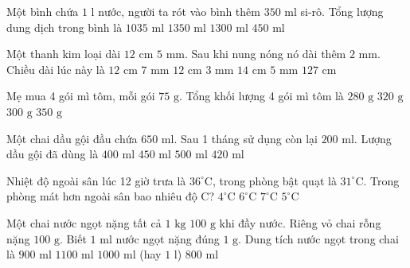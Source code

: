 \begin{ex} %
Một bình chứa $1\text{ l}$ nước, người ta rót vào bình thêm $350\text{ ml}$ si-rô. Tổng lượng dung dịch trong bình là
\choice
{$1035\text{ ml}$}
{\True $1350\text{ ml}$}
{$1300\text{ ml}$}
{$450\text{ ml}$}
\end{ex}

\begin{ex} %
Một thanh kim loại dài $12\text{ cm } 5\text{ mm}$. Sau khi nung nóng nó dài thêm $2\text{ mm}$. Chiều dài lúc này là
\choice
{\True $12\text{ cm } 7\text{ mm}$}
{$12\text{ cm } 3\text{ mm}$}
{$14\text{ cm } 5\text{ mm}$}
{$127\text{ cm}$}
\end{ex}

\begin{ex} %
Mẹ mua 4 gói mì tôm, mỗi gói $75\text{ g}$. Tổng khối lượng 4 gói mì tôm là
\choice
{$280\text{ g}$}
{$320\text{ g}$}
{\True $300\text{ g}$}
{$350\text{ g}$}
\end{ex}

\begin{ex} %
Một chai dầu gội đầu chứa $650\text{ ml}$. Sau 1 tháng sử dụng còn lại $200\text{ ml}$. Lượng dầu gội đã dùng là
\choice
{$400\text{ ml}$}
{\True $450\text{ ml}$}
{$500\text{ ml}$}
{$420\text{ ml}$}
\end{ex}

\begin{ex} %
Nhiệt độ ngoài sân lúc 12 giờ trưa là $36^\circ\text{C}$, trong phòng bật quạt là $31^\circ\text{C}$. Trong phòng mát hơn ngoài sân bao nhiêu độ C?
\choice
{$4^\circ\text{C}$}
{$6^\circ\text{C}$}
{$7^\circ\text{C}$}
{\True $5^\circ\text{C}$}
\end{ex}

\begin{ex} %
Một chai nước ngọt nặng tất cả $1\text{ kg } 100\text{ g}$ khi đầy nước. Riêng vỏ chai rỗng nặng $100\text{ g}$. Biết $1\text{ ml}$ nước ngọt nặng đúng $1\text{ g}$. Dung tích nước ngọt trong chai là
\choice
{$900\text{ ml}$}
{$1100\text{ ml}$}
{\True $1000\text{ ml}$ (hay $1\text{ l}$)}
{$800\text{ ml}$}
\end{ex}


